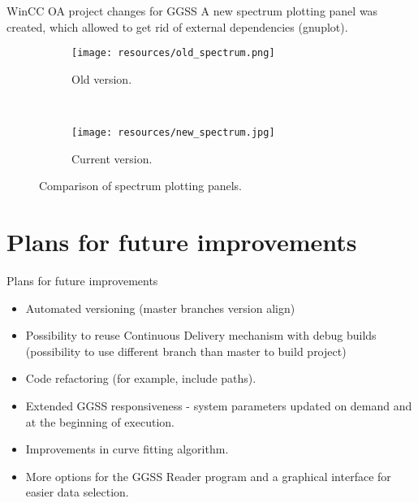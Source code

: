 \documentclass[10pt]{beamer}
\begin{document}
\begin{frame}{WinCC OA project changes for GGSS}
A new spectrum plotting panel was created, which allowed to get rid of external dependencies (gnuplot).
\begin{figure}[H]
  \centering
  \begin{subfigure}[t]{0.48\textwidth} 
      \centering
      \texttt{[image: resources/old\_spectrum.png]} 
      \caption{Old version.} 
  \end{subfigure}
  ~~
  \begin{subfigure}[t]{0.48\textwidth}
      \centering
      \texttt{[image: resources/new\_spectrum.jpg]} 
      \caption{Current version.} 
  \end{subfigure}
    
  \caption{Comparison of spectrum plotting panels.}

\end{figure}


\end{frame}

\section {Plans for future improvements}

\begin{frame}{Plans for future improvements}
\begin{itemize}
\item Automated versioning (master branches version align)
\item Possibility to reuse Continuous Delivery mechanism with debug builds (possibility to use different branch than master to build project)
\item Code refactoring (for example, include paths).
\item Extended GGSS responsiveness - system parameters updated on demand and at the beginning of execution.
\item Improvements in curve fitting algorithm.
\item More options for the GGSS Reader program and a graphical interface for easier data selection.
\end{itemize}
\end{frame}


\begin{frame}
\end{frame}
\end{document}
